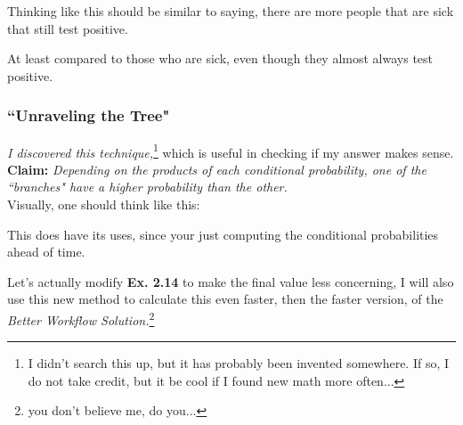 \documentclass[12pt]{book}
\begin{document}
Thinking like this should be similar to saying, there are more people that are sick that still test positive.

At least compared to those who are sick, even though they almost always test positive.

\subsubsection{\textbf{``Unraveling the Tree"}}
\textit{I discovered this technique,}\footnote{I didn't search this up, but it has probably been invented somewhere. If so, I do not take credit, but it be cool if I found new math more often...} which is useful in checking if my answer makes sense.\newpage
\textbf{Claim: }\textit{Depending on the products of each conditional probability, one of the ``branches" have a higher probability than the other.}\\
Visually, one should think like this:
\begin{center}
\end{center}

This does have its uses, since your just computing the conditional probabilities ahead of time. 

Let's actually modify \textbf{Ex. 2.14} to make the final value less concerning, I will also use this new method to calculate this even faster, then the faster version, of the\\
\textit{Better Workflow Solution.}\footnote{you don't believe me, do you...}\\
\end{document}

